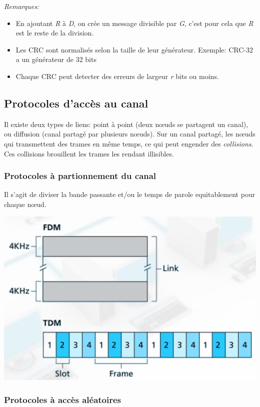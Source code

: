 \documentclass[a4paper, 12pt, french]{article}
\begin{document}
	\emph{Remarques:}
	\begin{itemize}
		\item En ajoutant \emph{R} à \emph{D}, on crée un message divisible par \emph{G}, c'est pour cela que \emph{R} est le reste de la division.
		\item Les CRC sont normalisés selon la taille de leur générateur. Exemple: CRC-32 a un générateur de 32 bits
		\item Chaque CRC peut detecter des erreurs de largeur \emph{r} bits ou moins.
	\end{itemize}

	\subsection{Protocoles d'accès au canal}

	Il existe deux types de liens: point à point (deux nœuds se partagent un canal), ou diffusion (canal partagé par plusieurs nœuds). Sur un canal partagé, les nœuds qui transmettent des trames en même temps, ce qui peut engender des \emph{collisions}. Ces collisions brouillent les trames les rendant illisibles.

	\subsubsection{Protocoles à partionnement du canal}

	Il s'agit de diviser la bande passante et/ou le temps de parole equitablement pour chaque nœud.

	\includegraphics[width=13.8cm]{reseau_partitionnement_canal}

	\subsubsection{Protocoles à accès aléatoires}
\end{document}
